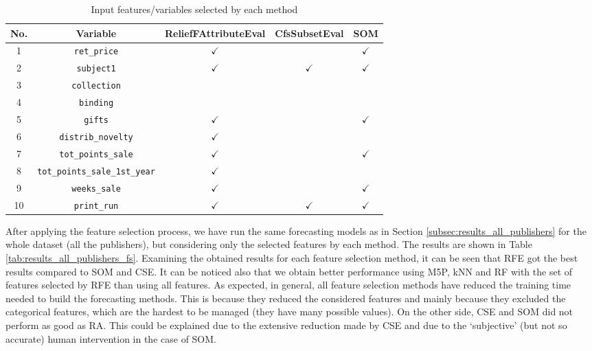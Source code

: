 \documentclass[a4paper,10pt,twocolumn,preprint,3p]{elsarticle}
\begin{document}
\begin{table*}
\caption{Input features/variables selected by each method
\label{tab:features_selected}}
\centering{}%
\begin{tabular}{|c|c|c|c|c|}
\hline 
No. & Variable & ReliefFAttributeEval & CfsSubsetEval & SOM\\
\hline 
1 & \texttt{ret\_price} & $\checkmark$ &  & $\checkmark$\\
\hline 
2 & \texttt{subject1} & $\checkmark$ & $\checkmark$ & $\checkmark$\\
\hline 
3 &  \texttt{collection} &  &  & \\
\hline 
4 & \texttt{binding} &  &  & \\
\hline 
5 & \texttt{gifts} & $\checkmark$ &  & $\checkmark$\\
\hline 
6 & \texttt{distrib\_novelty} & $\checkmark$ &  & \\
\hline 
7 & \texttt{tot\_points\_sale} & $\checkmark$ &  & $\checkmark$\\
\hline 
8 & \texttt{tot\_points\_sale\_1st\_year} & $\checkmark$ &  & \\
\hline 
9 & \texttt{weeks\_sale} & $\checkmark$ &  & $\checkmark$\\
\hline 
10 & \texttt{print\_run} & $\checkmark$ & $\checkmark$ & $\checkmark$\\
\hline 
\end{tabular}
\end{table*}


After applying the feature selection process, we have run the same
forecasting models as in Section \ref{subsec:results_all_publishers}
for the whole dataset (all the publishers), but considering only the
selected features by each method. The results are shown in Table
\ref{tab:results_all_publishers_fs}. Examining the obtained results
for each feature selection method, it can be seen that RFE got the
best results compared to SOM and CSE. It can be noticed also that we
obtain better performance using M5P, kNN and RF with the set of features
selected by RFE than using all features. %
As expected, in general, all feature selection methods have reduced the training time needed to build the forecasting methods. This is because they reduced the considered features and mainly because they excluded the categorical features, which are the hardest to be managed (they have many possible values). On the other side, CSE and SOM did not perform as good as RA. This could be explained due to the extensive reduction made by CSE and due to the `subjective' (but not so accurate) human intervention in the case of SOM. 
\end{document}
